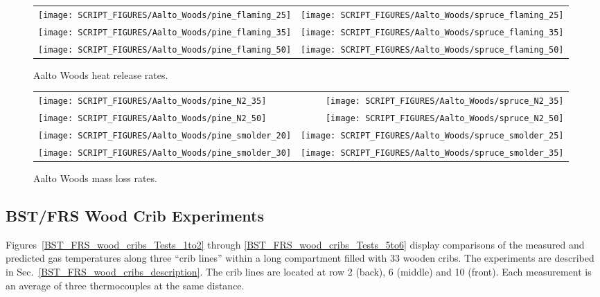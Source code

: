 \begin{figure}[!h]
\begin{tabular*}{\textwidth}{l@{\extracolsep{\fill}}r}
\texttt{[image: SCRIPT\_FIGURES/Aalto\_Woods/pine\_flaming\_25]} &
\texttt{[image: SCRIPT\_FIGURES/Aalto\_Woods/spruce\_flaming\_25]} \\
\texttt{[image: SCRIPT\_FIGURES/Aalto\_Woods/pine\_flaming\_35]} &
\texttt{[image: SCRIPT\_FIGURES/Aalto\_Woods/spruce\_flaming\_35]} \\
\texttt{[image: SCRIPT\_FIGURES/Aalto\_Woods/pine\_flaming\_50]} &
\texttt{[image: SCRIPT\_FIGURES/Aalto\_Woods/spruce\_flaming\_50]} \\
\end{tabular*}
\caption[Aalto Woods heat release rates]{Aalto Woods heat release rates.}
\label{Aalto_Woods_HRR}
\end{figure}

\begin{figure}[p]
\begin{tabular*}{\textwidth}{l@{\extracolsep{\fill}}r}
\texttt{[image: SCRIPT\_FIGURES/Aalto\_Woods/pine\_N2\_35]} &
\texttt{[image: SCRIPT\_FIGURES/Aalto\_Woods/spruce\_N2\_35]} \\
\texttt{[image: SCRIPT\_FIGURES/Aalto\_Woods/pine\_N2\_50]} &
\texttt{[image: SCRIPT\_FIGURES/Aalto\_Woods/spruce\_N2\_50]} \\
\texttt{[image: SCRIPT\_FIGURES/Aalto\_Woods/pine\_smolder\_20]} &
\texttt{[image: SCRIPT\_FIGURES/Aalto\_Woods/spruce\_smolder\_25]} \\
\texttt{[image: SCRIPT\_FIGURES/Aalto\_Woods/pine\_smolder\_30]} &
\texttt{[image: SCRIPT\_FIGURES/Aalto\_Woods/spruce\_smolder\_35]}
\end{tabular*}
\caption[Aalto Woods mass loss rates]{Aalto Woods mass loss rates.}
\label{Aalto_Woods_MLR}
\end{figure}


\clearpage

\subsection{BST/FRS Wood Crib Experiments}
\label{BST_FRS_wood_cribs_temperature}

Figures~\ref{BST_FRS_wood_cribs_Tests_1to2} through \ref{BST_FRS_wood_cribs_Tests_5to6} display comparisons of the measured and predicted gas temperatures along three ``crib lines'' within a long compartment filled with 33 wooden cribs. The experiments are described in Sec.~\ref{BST_FRS_wood_cribs_description}. The crib lines are located at row 2 (back), 6 (middle) and 10 (front). Each measurement is an average of three thermocouples at the same distance.

